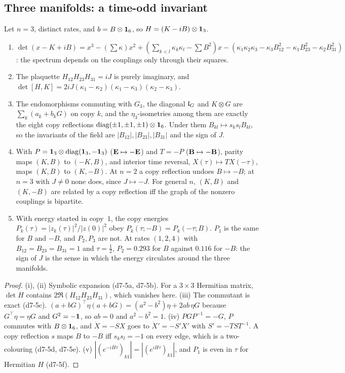 \subsection{Three manifolds: a time-odd invariant}
\label{d7:sec:three}

\begin{theorem}
\label{d7:thm:three}
Let $n=3$, distinct rates, and $b=B\otimes\mathbf 1_6$, so $H=(K-iB)\otimes\mathbf 1_3$.
\begin{enumerate}[label=(\roman*),leftmargin=2.2em]
\item $\det(x-K+iB)=x^3-(\textstyle\sum\kappa)x^2+(\sum_{k<l}\kappa_k\kappa_l-\sum B^2)x-(\kappa_1\kappa_2\kappa_3-\kappa_3B_{12}^2-\kappa_1B_{23}^2-\kappa_2B_{31}^2)$: the spectrum
depends on the couplings only through their squares.
\item The plaquette $H_{12}H_{23}H_{31}=iJ$ is purely imaginary, and $\det[H,K]=2iJ(\kappa_1-\kappa_2)(\kappa_1-\kappa_3)(\kappa_2-\kappa_3)$.
\item The endomorphisms commuting with $G_3$, the diagonal $\mathfrak l_G$ and $K\otimes G$ are $\sum_k(a_k+b_kG)$ on copy $k$, and the $\eta_3$-isometries among them are
exactly the eight copy reflections $\operatorname{diag}(\pm1,\pm1,\pm1)\otimes\mathbf 1_6$. Under them $B_{kl}\mapsto s_ks_lB_{kl}$, so the invariants of the field
are $|B_{12}|,|B_{23}|,|B_{31}|$ and the sign of $J$.
\item With $P=\mathbf 1_3\otimes\operatorname{diag}(\mathbf 1_3,-\mathbf 1_3)$ ($\mathbf E\mapsto-\mathbf E$) and $T=-P$ ($\mathbf B\mapsto-\mathbf B$), parity maps $(K,B)$ to $(-K,B)$, and interior
time reversal, $X(\tau)\mapsto TX(-\tau)$, maps $(K,B)$ to $(K,-B)$. At $n=2$ a copy reflection undoes $B\mapsto-B$; at $n=3$ with $J\neq0$ none does, since
$J\mapsto-J$. For general $n$, $(K,B)$ and $(K,-B)$ are related by a copy reflection iff the graph of the nonzero couplings is bipartite.
\item With energy started in copy~$1$, the copy energies $P_k(\tau)=|z_k(\tau)|^2/|z(0)|^2$ obey $P_k(\tau;-B)=P_k(-\tau;B)$. $P_1$ is the same for $B$ and
$-B$, and $P_2,P_3$ are not. At rates $(1,2,4)$ with $B_{12}=B_{23}=B_{31}=1$ and $\tau=\tfrac12$, $P_2=0.293$ for $B$ against $0.116$ for $-B$: the sign
of $J$ is the sense in which the energy circulates around the three manifolds.
\end{enumerate}
\end{theorem}

\begin{proof}
(i), (ii) Symbolic expansion (d7-5a, d7-5b). For a $3\times3$ Hermitian matrix, $\det H$ contains $2\Re(H_{12}H_{23}H_{31})$, which vanishes here.
(iii) The commutant is exact (d7-5c). $(a+bG)^{\!\top}\eta(a+bG)=(a^2-b^2)\eta+2ab\,\eta G$ because $G^{\!\top}\eta=\eta G$ and $G^2=-\mathbf 1$, so $ab=0$
and $a^2-b^2=1$. (iv) $PGP^{-1}=-G$, $P$ commutes with $B\otimes\mathbf 1_6$, and $\dot X=-SX$ goes to $\dot X'=-S'X'$ with $S'=-TST^{-1}$. A copy
reflection $s$ maps $B$ to $-B$ iff $s_ks_l=-1$ on every edge, which is a two-colouring (d7-5d, d7-5e). (v)
$|(e^{-i\bar H\tau})_{k1}|=|(e^{iH\tau})_{k1}|$, and $P_1$ is even in $\tau$ for Hermitian $H$ (d7-5f).
\end{proof}


